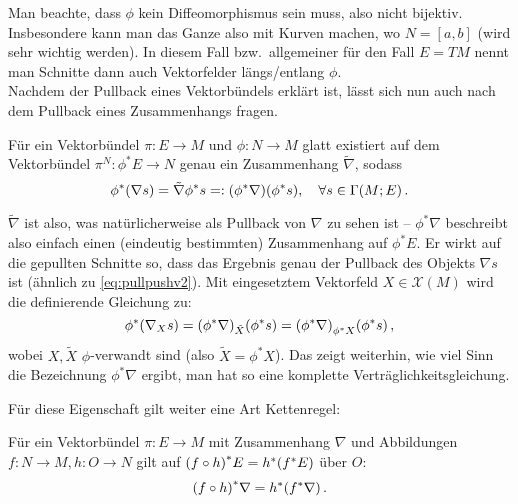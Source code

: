 Man beachte, dass $\phi$ kein Diffeomorphismus sein muss, also nicht bijektiv. Insbesondere kann man das Ganze also mit Kurven machen, wo $N = [a, b]$ (wird sehr wichtig werden). In diesem Fall bzw.~allgemeiner für den Fall $E = TM$ nennt man Schnitte dann auch Vektorfelder längs/entlang $\phi$.\\


Nachdem der Pullback eines Vektorbündels erklärt ist, lässt sich nun auch nach dem Pullback eines Zusammenhangs fragen.

\begin{satz}
Für ein Vektorbündel $\pi: E \rightarrow M$ und $\phi: N \rightarrow M$ glatt existiert auf dem Vektorbündel $\pi^N: \phi^* E \rightarrow N$ genau ein Zusammenhang $\tilde{\nabla}$, sodass
\begin{equation}
\phi^* \qty(\nabla s) = \tilde{\nabla} \phi^* s =: \qty(\phi^* \nabla) \qty(\phi^* s), \quad \forall s \in \Gamma(M; E) \, .
\end{equation}
\end{satz}

$\tilde{\nabla}$ ist also, was natürlicherweise als Pullback von $\nabla$ zu sehen ist -- $\phi^* \nabla$ beschreibt also einfach einen (eindeutig bestimmten) Zusammenhang auf $\phi^* E$. Er wirkt auf die gepullten Schnitte so, dass das Ergebnis genau der Pullback des Objekts $\nabla s$ ist (ähnlich zu \eqref{eq:pullpushv2}). Mit eingesetztem Vektorfeld $X \in \mathcal{X}(M)$ wird die definierende Gleichung zu:
\begin{equation}
\phi^* \qty(\nabla_X s) = \qty(\phi^* \nabla)_{\tilde{X}} \qty(\phi^* s) = \qty(\phi^* \nabla)_{\phi^* X} \qty(\phi^* s) \, ,
\end{equation}
wobei $X, \tilde{X}$ $\phi$-verwandt sind (also $\tilde{X} = \phi^* X$). Das zeigt weiterhin, wie viel Sinn die Bezeichnung $\phi^* \nabla$ ergibt, man hat so eine komplette Verträglichkeitsgleichung.

Für diese Eigenschaft gilt weiter eine Art Kettenregel:
\begin{satz}
Für ein Vektorbündel $\pi: E \rightarrow M$ mit Zusammenhang $\nabla$ und Abbildungen $f: N \rightarrow M, h: O \rightarrow N$ gilt auf $\qty(f \circ h)^* E = h^* \qty(f^* E)$ über $O$:
\begin{equation}
\qty(f \circ h)^* \nabla = h^* \qty(f^* \nabla) \, .
\end{equation}
\end{satz}


